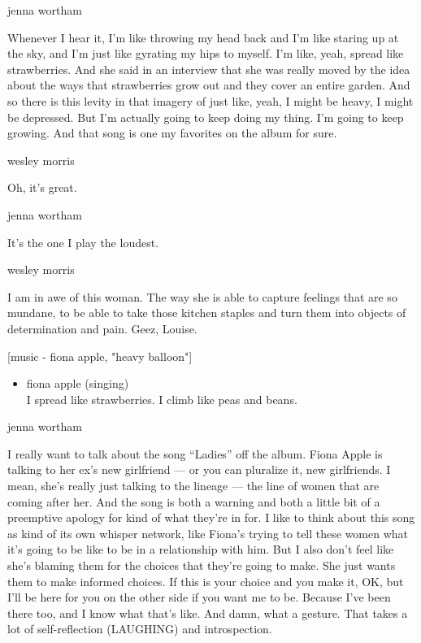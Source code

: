 jenna wortham

Whenever I hear it, I'm like throwing my head back and I'm like staring
up at the sky, and I'm just like gyrating my hips to myself. I'm like,
yeah, spread like strawberries. And she said in an interview that she
was really moved by the idea about the ways that strawberries grow out
and they cover an entire garden. And so there is this levity in that
imagery of just like, yeah, I might be heavy, I might be depressed. But
I'm actually going to keep doing my thing. I'm going to keep growing.
And that song is one my favorites on the album for sure.

wesley morris

Oh, it's great.

jenna wortham

It's the one I play the loudest.

wesley morris

I am in awe of this woman. The way she is able to capture feelings that
are so mundane, to be able to take those kitchen staples and turn them
into objects of determination and pain. Geez, Louise.

{[}music - fiona apple, "heavy balloon"{]}

\begin{itemize}
\tightlist
\item
  fiona apple (singing)\\
  I spread like strawberries. I climb like peas and beans.
\end{itemize}

jenna wortham

I really want to talk about the song ``Ladies'' off the album. Fiona
Apple is talking to her ex's new girlfriend --- or you can pluralize it,
new girlfriends. I mean, she's really just talking to the lineage ---
the line of women that are coming after her. And the song is both a
warning and both a little bit of a preemptive apology for kind of what
they're in for. I like to think about this song as kind of its own
whisper network, like Fiona's trying to tell these women what it's going
to be like to be in a relationship with him. But I also don't feel like
she's blaming them for the choices that they're going to make. She just
wants them to make informed choices. If this is your choice and you make
it, OK, but I'll be here for you on the other side if you want me to be.
Because I've been there too, and I know what that's like. And damn, what
a gesture. That takes a lot of self-reflection (LAUGHING) and
introspection.

